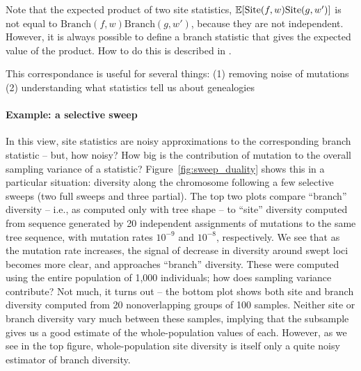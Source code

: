 \documentclass{article}
\newcommand{\branch}{\mbox{Branch}} %
\newcommand{\site}{\mbox{Site}} %
\newcommand{\iw}{w} %
\begin{document}
Note that the expected product of two site statistics,
$\E[\site(f, \iw) \site(g, \iw')]$
is not equal to $\branch(f, \iw) \branch(g, \iw')$,
because they are not independent.
However, it is always possible to define a branch statistic that
gives the expected value of the product.
How to do this is described in \citet{ralph2019empirical}.

This correspondance is useful for several things:
(1) removing noise of mutations
(2) understanding what statistics tell us about genealogies

\paragraph{Example: a selective sweep}
In this view,
site statistics are noisy approximations to the corresponding branch statistic
-- but, how noisy?
How big is the contribution of mutation to the overall sampling variance of a statistic?
Figure~\ref{fig:sweep_duality} shows this in a particular situation:
diversity along the chromosome following a few selective sweeps (two full sweeps and three partial).
The top two plots compare ``branch'' diversity -- i.e., as computed only with tree shape --
to ``site'' diversity computed from sequence generated by 20 independent assignments of mutations to the same tree sequence,
with mutation rates $10^{-9}$ and $10^{-8}$, respectively.
We see that as the mutation rate increases, the signal of decrease in diversity around swept loci becomes more clear,
and approaches ``branch'' diversity.
These were computed using the entire population of 1,000 individuals;
how does sampling variance contribute?
Not much, it turns out -- the bottom plot shows both site and branch diversity
computed from 20 nonoverlapping groups of 100 samples.
Neither site or branch diversity vary much between these samples,
implying that the subsample gives us a good estimate of the whole-population values of each.
However, as we see in the top figure,
whole-population site diversity is itself only a quite noisy estimator of branch diversity.
\end{document}
